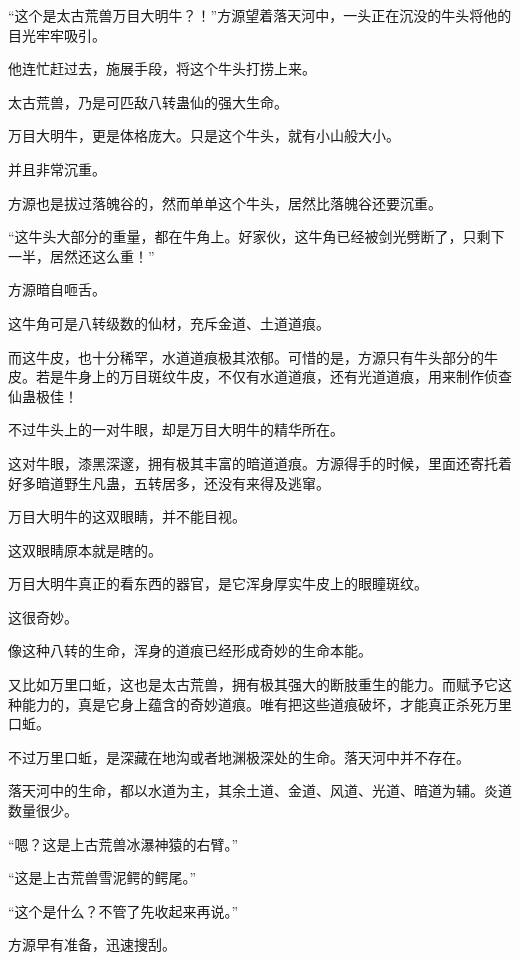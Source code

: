 
\begin{this_body}

“这个是太古荒兽万目大明牛？！”方源望着落天河中，一头正在沉没的牛头将他的目光牢牢吸引。

他连忙赶过去，施展手段，将这个牛头打捞上来。

太古荒兽，乃是可匹敌八转蛊仙的强大生命。

万目大明牛，更是体格庞大。只是这个牛头，就有小山般大小。

并且非常沉重。

方源也是拔过落魄谷的，然而单单这个牛头，居然比落魄谷还要沉重。

“这牛头大部分的重量，都在牛角上。好家伙，这牛角已经被剑光劈断了，只剩下一半，居然还这么重！”

方源暗自咂舌。

这牛角可是八转级数的仙材，充斥金道、土道道痕。

而这牛皮，也十分稀罕，水道道痕极其浓郁。可惜的是，方源只有牛头部分的牛皮。若是牛身上的万目斑纹牛皮，不仅有水道道痕，还有光道道痕，用来制作侦查仙蛊极佳！

不过牛头上的一对牛眼，却是万目大明牛的精华所在。

这对牛眼，漆黑深邃，拥有极其丰富的暗道道痕。方源得手的时候，里面还寄托着好多暗道野生凡蛊，五转居多，还没有来得及逃窜。

万目大明牛的这双眼睛，并不能目视。

这双眼睛原本就是瞎的。

万目大明牛真正的看东西的器官，是它浑身厚实牛皮上的眼瞳斑纹。

这很奇妙。

像这种八转的生命，浑身的道痕已经形成奇妙的生命本能。

又比如万里口蚯，这也是太古荒兽，拥有极其强大的断肢重生的能力。而赋予它这种能力的，真是它身上蕴含的奇妙道痕。唯有把这些道痕破坏，才能真正杀死万里口蚯。

不过万里口蚯，是深藏在地沟或者地渊极深处的生命。落天河中并不存在。

落天河中的生命，都以水道为主，其余土道、金道、风道、光道、暗道为辅。炎道数量很少。

“嗯？这是上古荒兽冰瀑神猿的右臂。”

“这是上古荒兽雪泥鳄的鳄尾。”

“这个是什么？不管了先收起来再说。”

方源早有准备，迅速搜刮。


\end{this_body}
